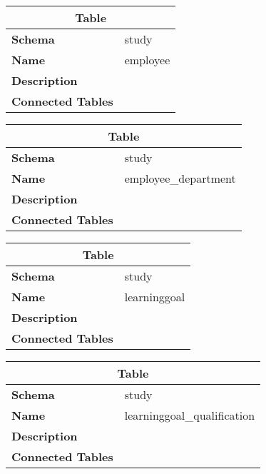 \begin{table}[H]
	\renewcommand{\arraystretch}{2}
	\centering
	\begin{tabular}{|p{}|p{}|}
		\hline
		\multicolumn{2}{|c|}{\textbf{Table}} \\ \hline
		\textbf{Schema}               & study \\ \hline
		\textbf{Name}                 & employee \\ \hline
		\textbf{Description}          &      \\ \hline
		\textbf{Connected Tables}     &      \\ \hline
	\end{tabular}
\end{table}

\begin{table}[H]
	\renewcommand{\arraystretch}{2}
	\centering
	\begin{tabular}{|p{}|p{}|}
		\hline
		\multicolumn{2}{|c|}{\textbf{Table}} \\ \hline
		\textbf{Schema}               & study \\ \hline
		\textbf{Name}                 & employee\_department \\ \hline
		\textbf{Description}          &      \\ \hline
		\textbf{Connected Tables}     &      \\ \hline
	\end{tabular}
\end{table}

\begin{table}[H]
	\renewcommand{\arraystretch}{2}
	\centering
	\begin{tabular}{|p{}|p{}|}
		\hline
		\multicolumn{2}{|c|}{\textbf{Table}} \\ \hline
		\textbf{Schema}               & study \\ \hline
		\textbf{Name}                 & learninggoal \\ \hline
		\textbf{Description}          &      \\ \hline
		\textbf{Connected Tables}     &      \\ \hline
	\end{tabular}
\end{table}

\begin{table}[H]
	\renewcommand{\arraystretch}{2}
	\centering
	\begin{tabular}{|p{}|p{}|}
		\hline
		\multicolumn{2}{|c|}{\textbf{Table}} \\ \hline
		\textbf{Schema}               & study \\ \hline
		\textbf{Name}                 & learninggoal\_qualification \\ \hline
		\textbf{Description}          &      \\ \hline
		\textbf{Connected Tables}     &      \\ \hline
	\end{tabular}
\end{table}

